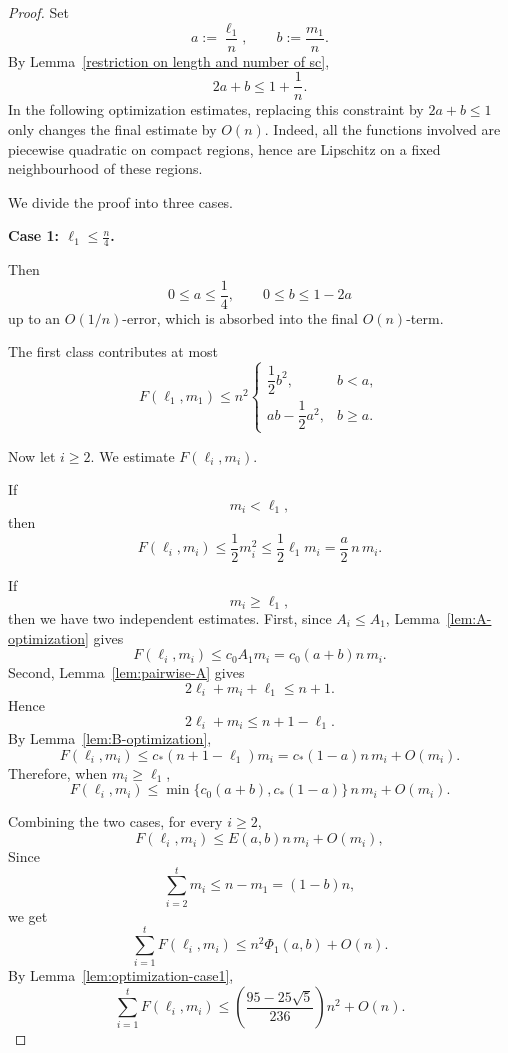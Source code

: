\documentclass[runningheads,envcountsame,a4paper]{llncs}
\begin{document}
\begin{proof}
Set
\[
        a:=\frac{\ell_1}{n},
        \qquad
        b:=\frac{m_1}{n}.
\]
By Lemma~\ref{restriction on length and number of sc},
\[
        2a+b\le 1+\frac1n.
\]
In the following optimization estimates, replacing this constraint by
\(2a+b\le1\) only changes the final estimate by \(O(n)\). Indeed, all the
functions involved are piecewise quadratic on compact regions, hence are
Lipschitz on a fixed neighbourhood of these regions.

We divide the proof into three cases.

\medskip

\noindent
\textbf{Case 1: \(\ell_1\le \frac n4\).}

Then
\[
        0\le a\le\frac14,
        \qquad
        0\le b\le 1-2a
\]
up to an \(O(1/n)\)-error, which is absorbed into the final \(O(n)\)-term.

The first class contributes at most
\[
        F(\ell_1,m_1)
        \le
        n^2
        \begin{cases}
        \dfrac12b^2,& b<a,\\[1mm]
        ab-\dfrac12a^2,& b\ge a.
        \end{cases}
\]

Now let \(i\ge2\). We estimate \(F(\ell_i,m_i)\).

If
\[
        m_i<\ell_1,
\]
then
\[
        F(\ell_i,m_i)\le \frac12m_i^2
        \le
        \frac12\ell_1m_i
        =
        \frac a2\,n\,m_i.
\]

If
\[
        m_i\ge\ell_1,
\]
then we have two independent estimates. First, since \(A_i\le A_1\),
Lemma~\ref{lem:A-optimization} gives
\[
        F(\ell_i,m_i)
        \le
        c_0A_1m_i
        =
        c_0(a+b)n\,m_i.
\]
Second, Lemma~\ref{lem:pairwise-A} gives
\[
        2\ell_i+m_i+\ell_1\le n+1.
\]
Hence
\[
        2\ell_i+m_i\le n+1-\ell_1.
\]
By Lemma~\ref{lem:B-optimization},
\[
        F(\ell_i,m_i)
        \le
        c_*(n+1-\ell_1)m_i
        =
        c_*(1-a)n\,m_i+O(m_i).
\]
Therefore, when \(m_i\ge\ell_1\),
\[
        F(\ell_i,m_i)
        \le
        \min\{c_0(a+b),c_*(1-a)\}\,n\,m_i+O(m_i).
\]

Combining the two cases, for every \(i\ge2\),
\[
        F(\ell_i,m_i)
        \le
        E(a,b)n\,m_i+O(m_i),
\]
Since
\[
        \sum_{i=2}^t m_i\le n-m_1=(1-b)n,
\]
we get
\[
        \sum_{i=1}^t F(\ell_i,m_i)
        \le
        n^2\Phi_1(a,b)+O(n).
\]
By Lemma~\ref{lem:optimization-case1},
\[
        \sum_{i=1}^t F(\ell_i,m_i)
        \le
        \left(\frac{95-25\sqrt5}{236}\right)n^2+O(n).
\]


\end{proof}
\end{document}
